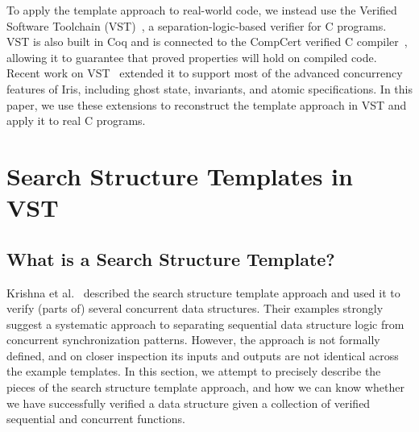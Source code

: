 \documentclass[sigplan,10pt,anonymous,review]{acmart}\settopmatter{printfolios=true,printccs=false,printacmref=false}
\begin{document}
To apply the template approach to real-world code, we instead use the Verified Software Toolchain (VST)~\cite{plcc}, a separation-logic-based verifier for C programs. VST is also built in Coq and is connected to the CompCert verified C compiler~\cite{compcert}, allowing it to guarantee that proved properties will hold on compiled code. Recent work on VST~\cite{iris-vst-arxiv} extended it to support most of the advanced concurrency features of Iris, including ghost state, invariants, and atomic specifications. In this paper, we use these extensions to reconstruct the template approach in VST and apply it to real C programs. %

\section{Search Structure Templates in VST}

\subsection{What is a Search Structure Template?}
Krishna et al.~\cite{templates} described the search structure template approach and used it to verify (parts of) several concurrent data structures. Their examples strongly suggest a systematic approach to separating sequential data structure logic from concurrent synchronization patterns. However, the approach is not formally defined, and on closer inspection its inputs and outputs are not identical across the example templates. In this section, we attempt to precisely describe the pieces of the search structure template approach, and how we can know whether we have successfully verified a data structure given a collection of verified sequential and concurrent functions.
\end{document}
